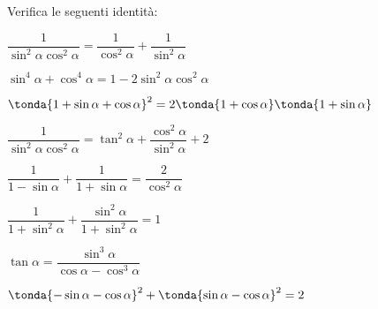 \begin{esercizio}\label{ese:03.1}
Verifica le seguenti identità:
 \begin{enumeratea}
  \item \(\dfrac{1}{\sin^2 \alpha \cos ^2 \alpha} = 
         \dfrac{1}{\cos ^2 \alpha} + \dfrac{1}{\sin^2 \alpha}\)
  \item \(\sin^4 \alpha + \cos ^4 \alpha = 1 - 2 \sin^2 \alpha \cos ^2 \alpha\)
  \item \(\tonda{1 + \sin \alpha + \cos \alpha}^2 =
         2 \tonda{1 + \cos \alpha} \tonda{1 + \sin \alpha}\)
  \item \(\dfrac{1}{\sin^2 \alpha \cos ^2 \alpha} = 
         \tan^2 \alpha + \dfrac{\cos^2 \alpha}{\sin^2 \alpha} + 2\)
  \item \(\dfrac{1}{1 - \sin \alpha} + \dfrac{1}{1 + \sin \alpha} =
         \dfrac{2}{\cos^2 \alpha}\)
  \item \(\dfrac{1}{1 + \sin^2 \alpha} + 
         \dfrac{\sin^2 \alpha}{1 + \sin^2 \alpha} = 1\)
  \item \(\tan \alpha =
         \dfrac{\sin^3 \alpha}{\cos \alpha - \cos^3 \alpha}\)
  \item \(\tonda{-\sin \alpha - \cos \alpha}^2 +
         \tonda{\sin \alpha - \cos \alpha}^2 = 2\)
 \end{enumeratea}
\end{esercizio}

